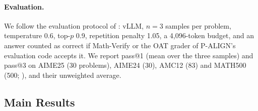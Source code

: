 \documentclass[11pt]{article}
\begin{document}
\paragraph{Evaluation.}
We follow the evaluation protocol of \citet{liu2026palign}: vLLM, $n=3$ samples per problem, temperature 0.6, top-$p$ 0.9, repetition penalty 1.05, a 4,096-token budget, and an answer counted as correct if Math-Verify \citep{mathverify} or the OAT grader of P-ALIGN's evaluation code accepts it.
We report pass@1 (mean over the three samples) and pass@3 on AIME25 (30 problems), AIME24 (30), AMC12 (83) and MATH500 (500; \citealp{hendrycks2021math,lightman2024verify}), and their unweighted average.

\subsection{Main Results}
\label{sec:results}
\end{document}
